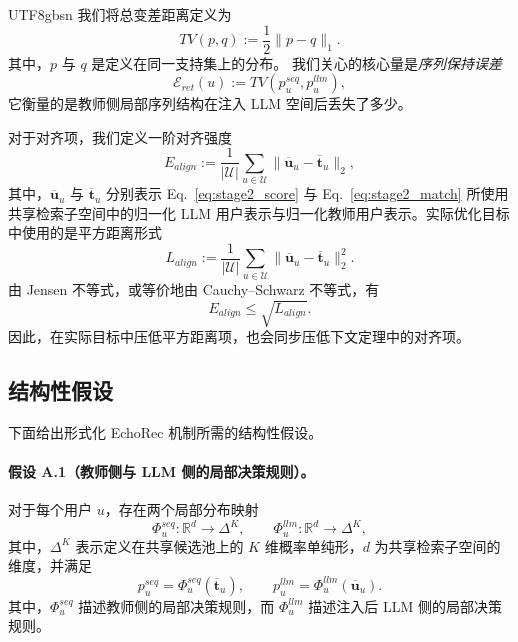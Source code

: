 \documentclass{article}
\begin{document}
\begin{CJK*}{UTF8}{gbsn}
我们将总变差距离定义为
\begin{equation}
TV(p,q):=\frac{1}{2}\|p-q\|_1.
\label{eq:tv_def}
\end{equation}
其中，$p$ 与 $q$ 是定义在同一支持集上的分布。
我们关心的核心量是\emph{序列保持误差}
\begin{equation}
\mathcal{E}_{ret}(u):=TV(p_u^{seq},p_u^{llm}),
\label{eq:ret_error}
\end{equation}
它衡量的是教师侧局部序列结构在注入 LLM 空间后丢失了多少。

对于对齐项，我们定义一阶对齐强度
\begin{equation}
E_{align}:=\frac{1}{|\mathcal U|}\sum_{u\in\mathcal U}\|\overline{\mathbf{u}}_u-\overline{\mathbf{t}}_u\|_2,
\label{eq:e_align}
\end{equation}
其中，$\overline{\mathbf{u}}_u$ 与 $\overline{\mathbf{t}}_u$ 分别表示 Eq.~\eqref{eq:stage2_score} 与 Eq.~\eqref{eq:stage2_match} 所使用共享检索子空间中的归一化 LLM 用户表示与归一化教师用户表示。实际优化目标中使用的是平方距离形式
\begin{equation}
L_{align}:=\frac{1}{|\mathcal U|}\sum_{u\in\mathcal U}\|\overline{\mathbf{u}}_u-\overline{\mathbf{t}}_u\|_2^2.
\label{eq:l_align}
\end{equation}
由 Jensen 不等式，或等价地由 Cauchy--Schwarz 不等式，有
\begin{equation}
E_{align}\le \sqrt{L_{align}}.
\label{eq:e_vs_l_align}
\end{equation}
因此，在实际目标中压低平方距离项，也会同步压低下文定理中的对齐项。

\subsection{结构性假设}
\label{app:theory_assumptions}

下面给出形式化 EchoRec 机制所需的结构性假设。

\paragraph{假设 A.1（教师侧与 LLM 侧的局部决策规则）。}
对于每个用户 $u$，存在两个局部分布映射
\begin{equation}
\Phi_u^{seq}:\mathbb{R}^d\to\Delta^K,
\qquad
\Phi_u^{llm}:\mathbb{R}^d\to\Delta^K,
\label{eq:two_maps}
\end{equation}
其中，$\Delta^K$ 表示定义在共享候选池上的 $K$ 维概率单纯形，$d$ 为共享检索子空间的维度，并满足
\begin{equation}
p_u^{seq}=\Phi_u^{seq}(\overline{\mathbf{t}}_u),
\qquad
p_u^{llm}=\Phi_u^{llm}(\overline{\mathbf{u}}_u).
\label{eq:map_outputs}
\end{equation}
其中，$\Phi_u^{seq}$ 描述教师侧的局部决策规则，而 $\Phi_u^{llm}$ 描述注入后 LLM 侧的局部决策规则。


\end{CJK*}
\end{document}

